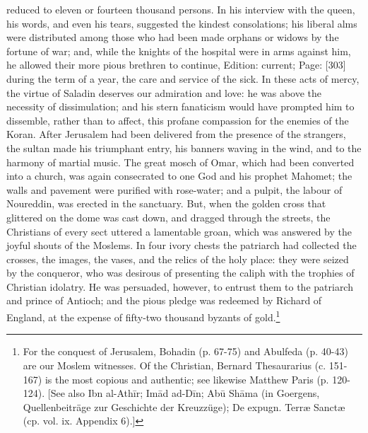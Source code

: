 reduced to eleven or fourteen thousand persons. In his interview with the queen, his words, and even his tears, suggested the kindest consolations; his liberal alms were distributed among those who had been made orphans or widows by the fortune of war; and, while the knights of the hospital were in arms against him, he allowed their more pious brethren to continue, Edition: current; Page: [303] during the term of a year, the care and service of the sick. In these acts of mercy, the virtue of Saladin deserves our admiration and love: he was above the necessity of dissimulation; and his stern fanaticism would have prompted him to dissemble, rather than to affect, this profane compassion for the enemies of the Koran. After Jerusalem had been delivered from the presence of the strangers, the sultan made his triumphant entry, his banners waving in the wind, and to the harmony of martial music. The great mosch of Omar, which had been converted into a church, was again consecrated to one God and his prophet Mahomet; the walls and pavement were purified with rose-water; and a pulpit, the labour of Noureddin, was erected in the sanctuary. But, when the golden cross that glittered on the dome was cast down, and dragged through the streets, the Christians of every sect uttered a lamentable groan, which was answered by the joyful shouts of the Moslems. In four ivory chests the patriarch had collected the crosses, the images, the vases, and the relics of the holy place: they were seized by the conqueror, who was desirous of presenting the caliph with the trophies of Christian idolatry. He was persuaded, however, to entrust them to the patriarch and prince of Antioch; and the pious pledge was redeemed by Richard of England, at the expense of fifty-two thousand byzants of gold.\footnote{For the conquest of Jerusalem, Bohadin (p. 67-75) and Abulfeda (p. 40-43) are our Moslem witnesses. Of the Christian, Bernard Thesaurarius (c. 151-167) is the most copious and authentic; see likewise Matthew Paris (p. 120-124). [See also Ibn al-Athīr; Imād ad-Dīn; Abū Shāma (in Goergens, Quellenbeiträge zur Geschichte der Kreuzzüge); De expugn. Terræ Sanctæ (cp. vol. ix. Appendix 6).]}

